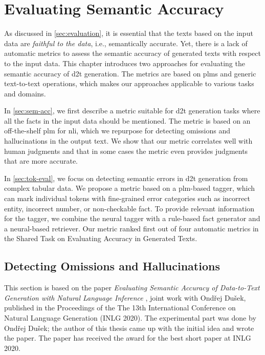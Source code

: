 
\chapter{Evaluating Semantic Accuracy}
\label{chap:evaluation}


As discussed in \autoref{sec:evaluation}, it is essential that the texts based on the input data are \emph{faithful to the data}, i.e., semantically accurate. Yet, there is a lack of automatic metrics to assess the semantic accuracy of generated texts with respect to the input data. This chapter introduces two approaches for evaluating the semantic accuracy of \ac{d2t} generation. The metrics are based on \acp{plm} and generic text-to-text operations, which makes our approaches applicable to various tasks and domains.

In \autoref{sec:sem-acc}, we first describe a metric suitable for \ac{d2t} generation tasks where all the facts in the input data should be mentioned. The metric is based on an off-the-shelf \ac{plm} for \ac{nli}, which we repurpose for detecting omissions and hallucinations in the output text. We show that our metric correlates well with human judgments and that in some cases the metric even provides judgments that are more accurate.

In \autoref{sec:tok-eval}, we focus on detecting semantic errors in \ac{d2t} generation from complex tabular data. We propose a metric based on a \ac{plm}-based tagger, which can mark individual tokens with fine-grained error categories such as incorrect entity, incorrect number, or non-checkable fact. To provide relevant information for the tagger, we combine the neural tagger with a rule-based fact generator and a neural-based retriever. Our metric ranked first out of four automatic metrics in the Shared Task on Evaluating Accuracy in Generated Texts.

\section{Detecting Omissions and Hallucinations}
\label{sec:sem-acc}

\begin{refbox}
    This section is based on the paper \emph{Evaluating Semantic Accuracy of Data-to-Text Generation with Natural Language Inference} \cite{dusekEvaluatingSemanticAccuracy2020}, joint work with Ondřej Dušek, published in the Proceedings of the The 13th International Conference on Natural Language Generation (INLG 2020). The experimental part was done by Ondřej Dušek; the author of this thesis came up with the initial idea and wrote the paper. The paper has received the award for the best short paper at INLG 2020.
\end{refbox}

